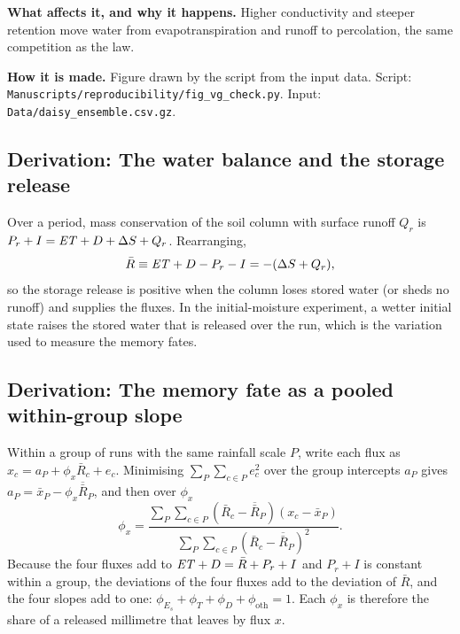 \textbf{What affects it, and why it happens.} Higher conductivity and steeper retention move water from evapotranspiration and runoff to percolation, the same competition as the law.

\textbf{How it is made.} Figure drawn by the script from the input data. Script: \nolinkurl{Manuscripts/reproducibility/fig_vg_check.py}. Input: \nolinkurl{Data/daisy_ensemble.csv.gz}.


\subsection{Derivation: The water balance and the storage release}\label{der:s1:2}
Over a period, mass conservation of the soil column with surface runoff $Q_r$ is $P_r+I=\mathit{ET}+D+\Delta S+Q_r$. Rearranging,
\begin{equation}\bar R\equiv\mathit{ET}+D-P_r-I=-(\Delta S+Q_r),\end{equation}
so the storage release is positive when the column loses stored water (or sheds no runoff) and supplies the fluxes. In the initial-moisture experiment, a wetter initial state raises the stored water that is released over the run, which is the variation used to measure the memory fates.


\subsection{Derivation: The memory fate as a pooled within-group slope}\label{der:s1:3}
Within a group of runs with the same rainfall scale $P$, write each flux as $x_c=a_P+\phi_x\bar R_c+e_c$. Minimising $\sum_P\sum_{c\in P}e_c^2$ over the group intercepts $a_P$ gives $a_P=\bar x_P-\phi_x\overline{\bar R}_P$, and then over $\phi_x$
\begin{equation}\phi_x=\frac{\sum_P\sum_{c\in P}(\bar R_c-\overline{\bar R}_P)(x_c-\bar x_P)}{\sum_P\sum_{c\in P}(\bar R_c-\overline{\bar R}_P)^2}.\end{equation}
Because the four fluxes add to $\mathit{ET}+D=\bar R+P_r+I$ and $P_r+I$ is constant within a group, the deviations of the four fluxes add to the deviation of $\bar R$, and the four slopes add to one: $\phi_{E_s}+\phi_T+\phi_D+\phi_{\mathrm{oth}}=1$. Each $\phi_x$ is therefore the share of a released millimetre that leaves by flux $x$.


